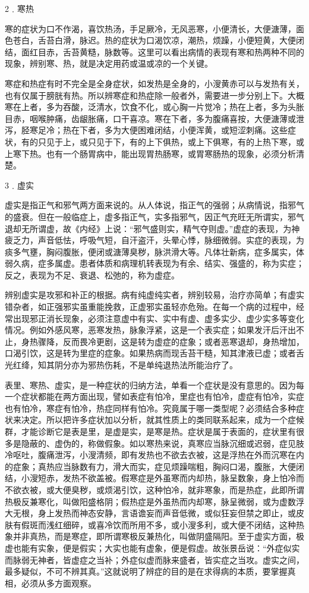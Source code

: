 \documentclass[a4paper,12pt,UTF8,twoside]{ctexbook}
\begin{document}
2﹒寒热

寒的症状为口不作渴，喜饮热汤，手足厥冷，无风恶寒，小便清长，大便溏薄，面色苍白，舌苔白滑，脉迟。热的症状为口渴饮凉，潮热，烦躁，小便短黄，大便闭结，面红目赤，舌苔黄糙，脉数等。这里可以看出病情的表现有寒和热两种不同的现象，辨别寒、热，就是决定用药或温或凉的一个关键。

寒症和热症有时不完全是全身症状，如发热是全身的，小溲黄赤可以与发热有关，也有仅属于膀胱有热。所以辨寒症和热症除一般者外，需要进一步分别上下。大概寒在上者，多为吞酸，泛清水，饮食不化，或心胸一片觉冷；热在上者，多为头胀目赤，咽喉肿痛，齿龈胀痛，口干喜凉。寒在下者，多为腹痛喜按，大便溏薄或泄泻，胫寒足冷；热在下者，多为大便困难闭结，小便浑黄，或短涩刺痛。这些症状，有的只见于上，或只见于下，有的上下俱热，或上下俱寒，有的上热下寒，或上寒下热。也有一个肠胃病中，能出现胃热肠寒，或胃寒肠热的现象，必须分析清楚。

3﹒虚实

虚实是指正气和邪气两方面来说的。从人体说，指正气的强弱；从病情说，指邪气的盛衰。但在一般临症上，虚多指正气，实多指邪气，因正气充旺无所谓实，邪气退却无所谓虚，故《内经》上说：“邪气盛则实，精气夺则虚。”虚症的表现，为神疲乏力，声音低怯，呼吸气短，自汗盗汗，头晕心悸，脉细微弱。实症的表现，为痰多气壅，胸闷腹胀，便闭或溏薄臭秽，脉洪滑大等。凡体壮新病，症多属实，体弱久病，症多属虚。患者体质和病理机转表现为有余、结实、强盛的，称为实症；反之，表现为不足、衰退、松弛的，称为虚症。

辨别虚实是攻邪和补正的根据。病有纯虚纯实者，辨别较易，治疗亦简单；有虚实错杂者，如正强邪实虽重能挽救，正虚邪实虽轻亦危殆。在每一个病的过程中，经常出现邪正消长现象，必须注意虚中有实、实中有虚、虚多实少、虚少实多等变化情况。例如外感风寒，恶寒发热，脉象浮紧，这是一个表实症；如果发汗后汗出不止，身热骤降，反而畏冷更剧，这是转为虚症的症象；或者恶寒退却，身热增加，口渴引饮，这是转为里症的症象。如果热病而现舌苔干糙，知其津液已虚；或者舌光红绛，知其阴分亦为邪热伤耗，不是单纯退热法所能治疗了。

表里、寒热、虚实，是一种症状的归纳方法，单看一个症状是没有意思的。因为每一个症状都能在两方面出现，譬如表症有怕冷，里症也有怕冷，虚症有怕冷，实症也有怕冷，寒症有怕冷，热症同样有怕冷。究竟属于哪一类型呢？必须结合多种症状来决定。所以把许多症状加以分析，就其性质上的类同联系起来，成为一个症候群，才能诊断它是表是里，是虚是实，是寒是热。症状是属于表面的，症状里有很多是隐蔽的、虚伪的，称做假象。如以寒热来说，真寒应当脉沉细或迟弱，症见肢冷呕吐，腹痛泄泻，小溲清频，即有发热也不欲去衣被，这是浮热在外而沉寒在内的症象；真热应当脉数有力，滑大而实，症见烦躁喘粗，胸闷口渴，腹胀，大便闭结，小溲短赤，发热不欲盖被。假寒症是外虽寒而内却热，脉呈数象，身上怕冷而不欲衣被，或大便臭秽，或烦渴引饮，这种怕冷，就非寒象，而是热症，此即所谓热极反兼寒化，叫做阳盛格阴；假热症是外虽热而内却寒，脉呈微弱，或为虚数浮大无根，身上发热而神态安静，言语谵妄而声音低微，或似狂妄但禁之即止，或皮肤有假斑而浅红细碎，或喜冷饮而所用不多，或小溲多利，或大便不闭结，这种热象并非真热，而是寒症，即所谓寒极反兼热化，叫做阴盛隔阳。至于虚实方面，极虚也能有实象，便是假实；大实也能有虚象，便是假虚。故张景岳说：“外症似实而脉弱无神者，皆虚症之当补；外症似虚而脉来盛者，皆实症之当攻。虚实之间，最多疑似，不可不辨其真。”这就说明了辨症的目的是在求得病的本质，要掌握真相，必须从多方面观察。
\end{document}
